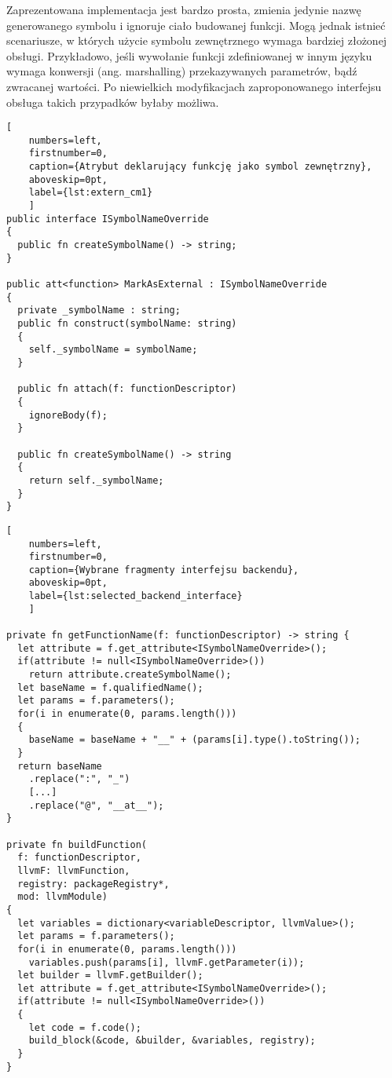 Zaprezentowana implementacja jest bardzo prosta, zmienia jedynie nazwę generowanego symbolu i ignoruje ciało budowanej funkcji.
Mogą jednak istnieć scenariusze, w których użycie symbolu zewnętrznego wymaga bardziej złożonej obsługi.
Przykładowo, jeśli wywołanie funkcji zdefiniowanej w innym języku wymaga konwersji (ang. marshalling) przekazywanych parametrów, bądź zwracanej wartości.
Po niewielkich modyfikacjach zaproponowanego interfejsu obsługa takich przypadków byłaby możliwa.

\begin{minipage}{\linewidth}
  
  \begin{lstlisting}[
    numbers=left,
    firstnumber=0,
    caption={Atrybut deklarujący funkcję jako symbol zewnętrzny},
    aboveskip=0pt,
    label={lst:extern_cm1}
    ]
public interface ISymbolNameOverride
{
  public fn createSymbolName() -> string;
}

public att<function> MarkAsExternal : ISymbolNameOverride
{
  private _symbolName : string;
  public fn construct(symbolName: string)
  {
    self._symbolName = symbolName;
  }

  public fn attach(f: functionDescriptor)
  {
    ignoreBody(f);
  }

  public fn createSymbolName() -> string
  {
    return self._symbolName;
  }
}
\end{lstlisting}
\end{minipage}

\begin{minipage}{\linewidth}
  
  \begin{lstlisting}[
    numbers=left,
    firstnumber=0,
    caption={Wybrane fragmenty interfejsu backendu},
    aboveskip=0pt,
    label={lst:selected_backend_interface}
    ]

private fn getFunctionName(f: functionDescriptor) -> string {
  let attribute = f.get_attribute<ISymbolNameOverride>();
  if(attribute != null<ISymbolNameOverride>())
    return attribute.createSymbolName();
  let baseName = f.qualifiedName();
  let params = f.parameters();
  for(i in enumerate(0, params.length()))
  {
    baseName = baseName + "__" + (params[i].type().toString());
  }
  return baseName
    .replace(":", "_")
    [...]
    .replace("@", "__at__");
}

private fn buildFunction(
  f: functionDescriptor,
  llvmF: llvmFunction,
  registry: packageRegistry*,
  mod: llvmModule)
{
  let variables = dictionary<variableDescriptor, llvmValue>();
  let params = f.parameters();
  for(i in enumerate(0, params.length()))
    variables.push(params[i], llvmF.getParameter(i));
  let builder = llvmF.getBuilder();
  let attribute = f.get_attribute<ISymbolNameOverride>();
  if(attribute != null<ISymbolNameOverride>())
  {
    let code = f.code();
    build_block(&code, &builder, &variables, registry);
  }
}

\end{lstlisting}
\end{minipage}

